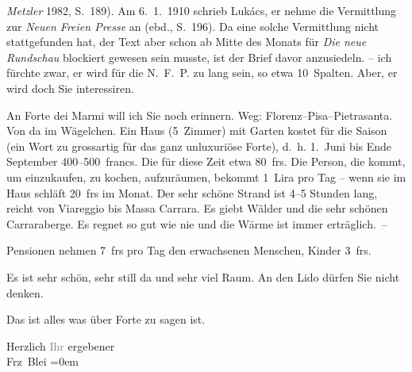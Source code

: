 {{{                        \emph{Metzler}{ }1982, S. 189). Am 6. 1. 1910 schrieb Lukács, er nehme die Vermittlung zur \emph{Neuen Freien Presse} an (ebd.,
                     S. 196). Da eine solche Vermittlung nicht stattgefunden hat,
                  der Text aber schon ab Mitte des Monats für \emph{Die
                     neue Rundschau} blockiert gewesen sein musste, ist der Brief davor
                  anzusiedeln.}}}\label{K_L01998-2} – ich fürchte zwar, er wird für die N. F. P. zu lang sein, so etwa 10 Spalten. Aber, er wird doch Sie
               interessiren.\pend
           
\pstart
           An Forte dei Marmi will ich Sie noch erinnern.
               Weg: Florenz–Pisa–Pietrasanta. Von da im Wägelchen.
               Ein Haus (5 Zimmer) mit Garten kostet für die Saison (ein Wort zu grossartig für das
               ganz unluxuriöse Forte), d. h.
                  1. Juni bis Ende September 400–500 francs. Die \label{K_L01998-3v}\label{K_L01998-3} für diese Zeit etwa 80 frs.
               Die Person, die kommt, um einzukaufen, zu kochen, aufzuräumen, bekommt 1 Lira pro Tag
               – wenn sie im Haus schläft 20 frs im Monat. {\pb}Der sehr schöne Strand ist 4–5 Stunden
               lang, reicht von Viareggio bis Massa Carrara. Es giebt Wälder und die sehr
               schönen Carraraberge. Es regnet so gut wie nie
               und die Wärme ist immer erträglich. –\pend
           
\pstart
           Pensionen nehmen 7 frs pro Tag den erwachsenen Menschen, Kinder 3 frs.\pend
           
\pstart
           Es ist sehr schön, sehr still da und sehr viel Raum. An den Lido dürfen Sie nicht denken.\pend
           
\pstart
           Das ist alles was über Forte zu sagen ist.\pend
           
\pstart
           Herzlich \textcolor{gray}{Ihr} ergebener{\\[\baselineskip]}\spacefill\mbox{Frz Blei}\pend
           \leftskip=0em{}\endnumbering{}  \newcommand{\dateiname}{L01998}\newcommand{\titel}{Franz Blei an Arthur Schnitzler, [Anfang? Januar 1911]}\newcommand{\editorInnen}{Martin Anton Müller und Gerd-Hermann Susen}
